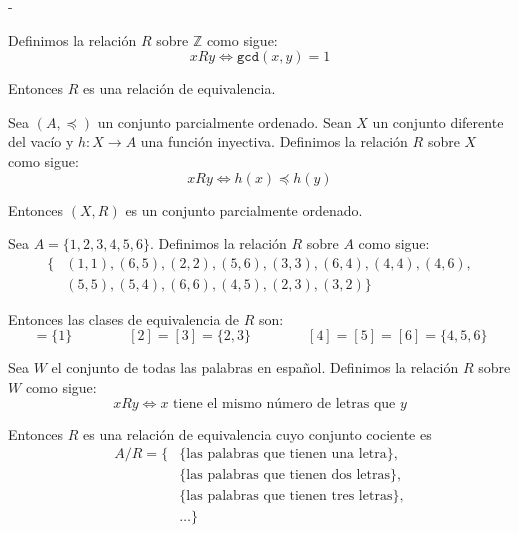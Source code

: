 \documentclass[12pt, a4paper]{exam}
\makeatletter
\renewenvironment{checkboxes}%
   {\setcounter{choice}{0}\list{\checkbox@char}%
      {%
        \settowidth{\leftmargin}{W.\hskip\labelsep\hskip 2.5em}%
        \def\choice{%
          \if@correctchoice
            \color@endgroup \endgroup
          \fi
          \stepcounter{choice}
          \item[\checked@char]
          \do@choice@pageinfo
        } %
        \def\CorrectChoice{%
          \if@correctchoice
            \color@endgroup \endgroup
          \fi
          \ifprintanswers
            \ifhmode \unskip\unskip\unvbox\voidb@x \fi
            \begingroup \color@begingroup \@correctchoicetrue
            \CorrectChoice@Emphasis
            \stepcounter{choice}
            \item[\checked@char]
          \else
            \stepcounter{choice}
            \item[\checked@char]
          \fi
          \do@choice@pageinfo
        } %
        \let\correctchoice\CorrectChoice
        \labelwidth\leftmargin\advance\labelwidth-\labelsep
        \topsep=0pt
        \partopsep=0pt
        \checkboxeshook
      }%
   }%
   {\if@correctchoice \color@endgroup \endgroup \fi \endlist}
\makeatother
\begin{document}
    \begin{questions}
        \begin{checkboxes}
            \choice Definimos la relación $R$ sobre $\mathbb{Z}$ como sigue:
            \begin{equation*}
                xRy \Leftrightarrow \texttt{gcd}(x,y) = 1
            \end{equation*}

            Entonces $R$ es una relación de equivalencia. 

            \choice Sea $(A, \preceq)$ un conjunto parcialmente ordenado. Sean 
            $X$ un conjunto diferente del vacío y $h: X \rightarrow A$ una 
            función inyectiva. Definimos la relación $R$ sobre $X$ como sigue:
            \begin{equation*}
                xRy \Leftrightarrow h(x) \preceq h(y)
            \end{equation*}

            Entonces $(X, R)$ es un conjunto parcialmente ordenado. %

            \choice Sea $A = \{1,2,3,4,5,6\}$. Definimos la relación $R$ sobre  
            $A$ como sigue:
            \begin{align*}
                \{&(1,1), (6,5), (2,2), (5,6), (3,3), (6,4), (4,4), (4,6), \\ 
                &(5,5), (5,4), (6,6), (4,5), (2,3), (3,2)\}
            \end{align*}

            Entonces las clases de equivalencia de $R$ son:
            \begin{equation*}
                [1] = \{1\} \quad \quad \quad \quad 
                [2] = [3] = \{2,3\} \quad \quad \quad \quad   
                [4] = [5] = [6] = \{4,5,6\} 
            \end{equation*} %

            \choice Sea $W$ el conjunto de todas las palabras en español. 
            Definimos la relación $R$ sobre $W$ como sigue:
            \begin{equation*}
                xRy \Leftrightarrow x \text{ tiene el mismo número de letras 
                que } y
            \end{equation*}

            Entonces $R$ es una relación de equivalencia cuyo conjunto cociente 
            es 
            \begin{align*}
                A/R = \{
                        &\{\text{las palabras que tienen una letra}\}, \\ 
                        &\{\text{las palabras que tienen dos letras}\}, \\ 
                        &\{\text{las palabras que tienen tres letras}\}, \\  
                        &\ldots
                      \}
            \end{align*} %
            

\end{checkboxes}
\end{questions}
\end{document}
